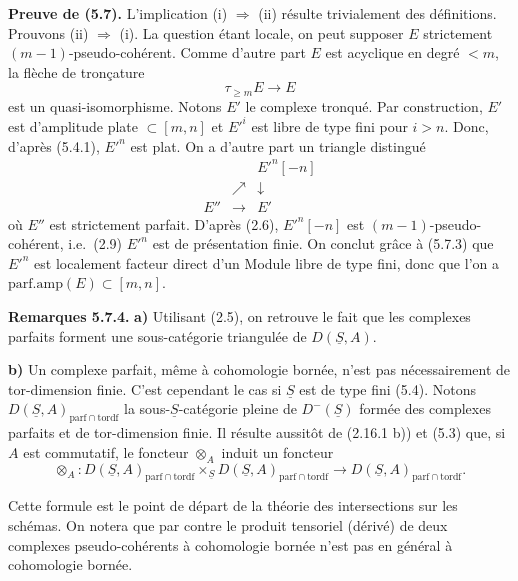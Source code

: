 \textbf{Preuve de (5.7).} L'implication (i) $\Rightarrow$ (ii) résulte trivialement des définitions. Prouvons (ii) $\Rightarrow$ (i). La question étant locale, on peut supposer $E$ strictement $(m-1)$-pseudo-cohérent. Comme d'autre part $E$ est acyclique en degré $< m$, la flèche de tronçature
\[
\tau_{\geqslant m} E \longrightarrow E
\]
est un quasi-isomorphisme. Notons $E'$ le complexe tronqué. Par construction, $E'$ est d'amplitude plate $\subset [m, n]$ et $E'^i$ est libre de type fini pour $i > n$. Donc, d'après (5.4.1), $E'^n$ est plat. On a d'autre part un triangle distingué
\[
\begin{array}{ccc}
& & E'^n[-n] \\
& \nearrow & \downarrow \\
E'' & \longrightarrow & E'
\end{array}
\]
où $E''$ est strictement parfait. D'après (2.6), $E'^n[-n]$ est $(m-1)$-pseudo-cohérent, i.e.\ (2.9) $E'^n$ est de présentation finie. On conclut grâce à (5.7.3) que $E'^n$ est localement facteur direct d'un Module libre de type fini, donc que l'on a $\mathrm{parf.amp}(E) \subset [m, n]$.

\textbf{Remarques 5.7.4.}
\textbf{a)} Utilisant (2.5), on retrouve le fait que les complexes parfaits forment une sous-catégorie triangulée de $D(\underline{S}, A)$.

\textbf{b)} Un complexe parfait, même à cohomologie bornée, n'est pas nécessairement de tor-dimension finie. C'est cependant le cas si $\underline{S}$ est de type fini (5.4). Notons $D(\underline{S}, A)_{\mathrm{parf} \cap \mathrm{tordf}}$ la sous-$\underline{S}$-catégorie pleine de $D^-(\underline{S})$ formée des complexes parfaits et de tor-dimension finie. Il résulte aussitôt de (2.16.1 b)) et (5.3) que, si $A$ est commutatif, le foncteur $\otimes_A$ induit un foncteur
\[
\otimes_A : D(\underline{S}, A)_{\mathrm{parf} \cap \mathrm{tordf}} \times_{\underline{S}} D(\underline{S}, A)_{\mathrm{parf} \cap \mathrm{tordf}} \longrightarrow D(\underline{S}, A)_{\mathrm{parf} \cap \mathrm{tordf}}.
\]

Cette formule est le point de départ de la théorie des intersections sur les schémas. On notera que par contre le produit tensoriel (dérivé) de deux complexes pseudo-cohérents à cohomologie bornée n'est pas en général à cohomologie bornée.

